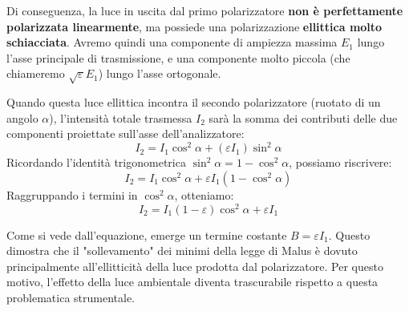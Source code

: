 \documentclass[openany,a4paper,12pt]{book}
\begin{document}
\begin{center}
\end{center}

Di conseguenza, la luce in uscita dal primo polarizzatore \textbf{non è perfettamente polarizzata linearmente}, ma possiede una polarizzazione \textbf{ellittica molto schiacciata}.
Avremo quindi una componente di ampiezza massima $E_1$ lungo l'asse principale di trasmissione, e una componente molto piccola (che chiameremo $\sqrt{\varepsilon} E_1$) lungo l'asse ortogonale. 

Quando questa luce ellittica incontra il secondo polarizzatore (ruotato di un angolo $\alpha$), l'intensità totale trasmessa $I_2$ sarà la somma dei contributi delle due componenti proiettate sull'asse dell'analizzatore:
\begin{equation}
    I_2 = I_1 \cos^2 \alpha + (\varepsilon I_1) \sin^2 \alpha
\end{equation}
Ricordando l'identità trigonometrica $\sin^2 \alpha = 1 - \cos^2 \alpha$, possiamo riscrivere:
\begin{equation}
    I_2 = I_1 \cos^2 \alpha + \varepsilon I_1 (1 - \cos^2 \alpha)
\end{equation}
Raggruppando i termini in $\cos^2\alpha$, otteniamo:
\begin{equation}
    I_2 = I_1(1 - \varepsilon)\cos^2 \alpha + \varepsilon I_1
\end{equation}
\begin{nota}
Come si vede dall'equazione, emerge un termine costante $B = \varepsilon I_1$. Questo dimostra che il "sollevamento" dei minimi della legge di Malus è dovuto principalmente all'ellitticità della luce prodotta dal polarizzatore. Per questo motivo, l'effetto della luce ambientale diventa trascurabile rispetto a questa problematica strumentale.
\end{nota}
\end{document}
